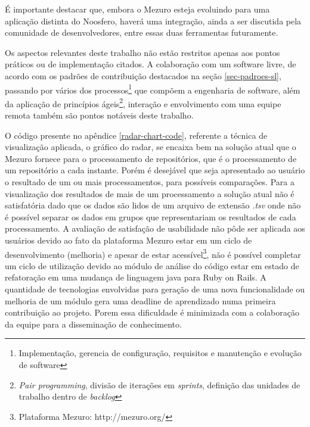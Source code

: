 É importante destacar que, embora o Mezuro esteja evoluindo para uma aplicação distinta do Noosfero, haverá uma integração, ainda a ser discutida pela comunidade de desenvolvedores, entre essas duas ferramentas futuramente.

Os aspectos relevantes deste trabalho não estão restritos apenas aos  pontos práticos ou de implementação citados. A colaboração com um software livre, de acordo com os padrões de contribuição destacados na seção \ref{sec-padroes-sl}, passando por vários dos processos\footnote{Implementação, gerencia de configuração, requisitos e manutenção e evolução de software} que compõem a engenharia de software, além da aplicação de princípios ágeis\footnote{\textit{Pair programming}, divisão de iterações em \textit{sprints}, definição das unidades de trabalho dentro de \textit{backlog}}, interação e envolvimento com uma equipe remota também são pontos notáveis deste trabalho.

O código presente no apêndice \ref{radar-chart-code}, referente a técnica de visualização aplicada, o gráfico do radar, se encaixa bem na solução atual que o Mezuro fornece para o processamento de repositórios, que é o processamento de um repositório a cada instante. Porém é desejável que seja apresentado ao usuário o resultado de um ou mais processamentos, para possíveis comparações. Para a visualização dos resultados de mais de um processamento a solução atual não é satisfatória dado que os dados são lidos de um arquivo de extensão \textit{.tsv} onde não é possível separar os dados em grupos que representariam os resultados de cada processamento.
A avaliação de satisfação de usabilidade não pôde ser aplicada aos usuários devido ao fato da plataforma Mezuro estar em um ciclo de desenvolvimento (melhoria) e apesar de estar acessível\footnote{Plataforma Mezuro: http://mezuro.org/}, não é possível completar um ciclo de utilização devido ao módulo de análise do código estar em estado de refatoração em uma mudança de linguagem java para Ruby on Rails.
A quantidade de tecnologias envolvidas para geração de uma nova funcionalidade ou melhoria de um módulo gera uma deadline de aprendizado numa primeira contribuição ao projeto. Porem essa dificuldade é minimizada com a colaboração da equipe para a disseminação de conhecimento.

